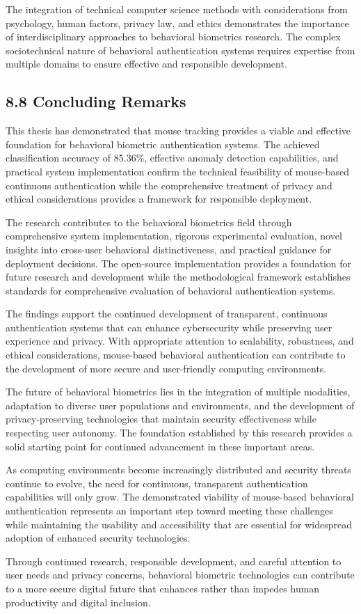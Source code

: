 \documentclass[
  11pt,
  a4paper,
]{article}
\begin{document}
The integration of technical computer science methods with
considerations from psychology, human factors, privacy law, and ethics
demonstrates the importance of interdisciplinary approaches to
behavioral biometrics research. The complex sociotechnical nature of
behavioral authentication systems requires expertise from multiple
domains to ensure effective and responsible development.

\subsection{8.8 Concluding Remarks}\label{concluding-remarks}

This thesis has demonstrated that mouse tracking provides a viable and
effective foundation for behavioral biometric authentication systems.
The achieved classification accuracy of 85.36\%, effective anomaly
detection capabilities, and practical system implementation confirm the
technical feasibility of mouse-based continuous authentication while the
comprehensive treatment of privacy and ethical considerations provides a
framework for responsible deployment.

The research contributes to the behavioral biometrics field through
comprehensive system implementation, rigorous experimental evaluation,
novel insights into cross-user behavioral distinctiveness, and practical
guidance for deployment decisions. The open-source implementation
provides a foundation for future research and development while the
methodological framework establishes standards for comprehensive
evaluation of behavioral authentication systems.

The findings support the continued development of transparent,
continuous authentication systems that can enhance cybersecurity while
preserving user experience and privacy. With appropriate attention to
scalability, robustness, and ethical considerations, mouse-based
behavioral authentication can contribute to the development of more
secure and user-friendly computing environments.

The future of behavioral biometrics lies in the integration of multiple
modalities, adaptation to diverse user populations and environments, and
the development of privacy-preserving technologies that maintain
security effectiveness while respecting user autonomy. The foundation
established by this research provides a solid starting point for
continued advancement in these important areas.

As computing environments become increasingly distributed and security
threats continue to evolve, the need for continuous, transparent
authentication capabilities will only grow. The demonstrated viability
of mouse-based behavioral authentication represents an important step
toward meeting these challenges while maintaining the usability and
accessibility that are essential for widespread adoption of enhanced
security technologies.

Through continued research, responsible development, and careful
attention to user needs and privacy concerns, behavioral biometric
technologies can contribute to a more secure digital future that
enhances rather than impedes human productivity and digital inclusion.

\newpage
\end{document}
